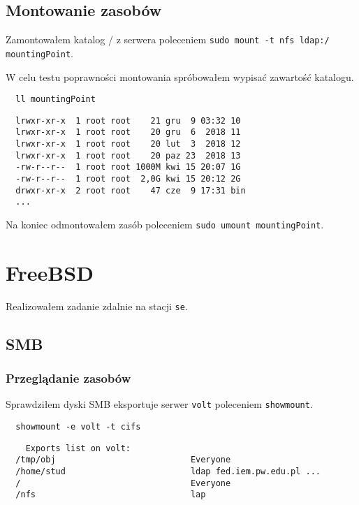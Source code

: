 \documentclass{article} %
\begin{document}
\subsection{Montowanie zasobów}
Zamontowałem katalog / z serwera poleceniem \texttt{sudo mount -t nfs ldap:/ mountingPoint}.

W celu testu poprawności montowania spróbowałem wypisać zawartość katalogu.
\begin{tcolorbox}[colback=yellow!10!white,colframe=red!45!black,coltitle=yellow!100!black, title=Ubuntu]
  \begin{lstlisting}
  ll mountingPoint
  \end{lstlisting}
  \tcblower
  \footnotesize
  \begin{lstlisting}
  lrwxr-xr-x  1 root root    21 gru  9 03:32 10
  lrwxr-xr-x  1 root root    20 gru  6  2018 11
  lrwxr-xr-x  1 root root    20 lut  3  2018 12
  lrwxr-xr-x  1 root root    20 paz 23  2018 13
  -rw-r--r--  1 root root 1000M kwi 15 20:07 1G 
  -rw-r--r--  1 root root  2,0G kwi 15 20:12 2G
  drwxr-xr-x  2 root root    47 cze  9 17:31 bin
  ...
  \end{lstlisting}
\end{tcolorbox}
\normalsize
\vspace{5mm}

Na koniec odmontowałem zasób poleceniem \texttt{sudo umount mountingPoint}.

\section{FreeBSD}
Realizowałem zadanie zdalnie na stacji \texttt{se}.

\subsection{SMB}

\subsubsection{Przeglądanie zasobów}
Sprawdziłem dyski SMB eksportuje serwer \texttt{volt} poleceniem \texttt{showmount}.

\begin{tcolorbox}[colback=yellow!10!white,colframe=red!45!black,coltitle=yellow!100!black, title=FreeBSD]
  \begin{lstlisting}
  showmount -e volt -t cifs
  \end{lstlisting}
  \tcblower
  \tiny
  \begin{lstlisting}
    Exports list on volt:
  /tmp/obj                           Everyone
  /home/stud                         ldap fed.iem.pw.edu.pl ...
  /                                  Everyone
  /nfs                               lap
  \end{lstlisting}
\end{tcolorbox}
\normalsize
\end{document}
